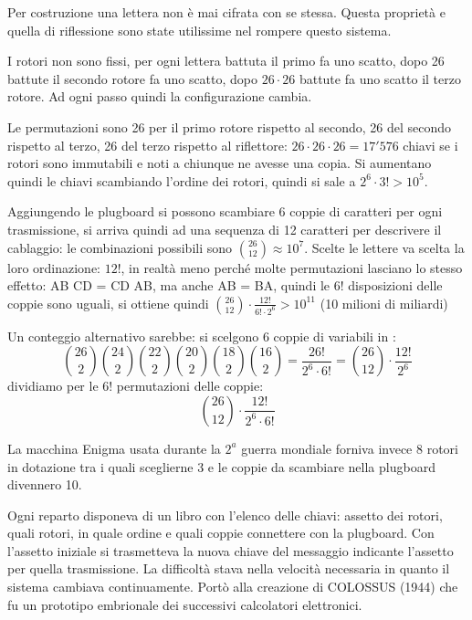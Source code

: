 Per costruzione una lettera non è mai cifrata con se stessa. Questa proprietà e quella di riflessione sono state utilissime nel rompere questo sistema.

I rotori non sono fissi, per ogni lettera battuta il primo fa uno scatto, dopo 26 battute il secondo rotore fa uno scatto, dopo $26 \cdot 26$ battute fa uno scatto il terzo rotore. Ad ogni passo quindi la configurazione cambia.

Le permutazioni sono 26 per il primo rotore rispetto al secondo, 26 del secondo rispetto al terzo, 26 del terzo rispetto al riflettore: $26 \cdot 26 \cdot 26 = 17'576$ chiavi se i rotori sono immutabili e noti a chiunque ne avesse una copia. Si aumentano quindi le chiavi scambiando l'ordine dei rotori, quindi si sale a $2^6 \cdot 3! > 10^5$.

Aggiungendo le plugboard si possono scambiare 6 coppie di caratteri per ogni trasmissione, si arriva quindi ad una sequenza di 12 caratteri per descrivere il cablaggio: le combinazioni possibili sono $\binom{26}{12} \approx 10^7$. Scelte le lettere va scelta la loro ordinazione: $12!$, in realtà meno perché molte permutazioni lasciano lo stesso effetto: AB CD = CD AB, ma anche AB = BA, quindi le $6!$ disposizioni delle coppie sono uguali, si ottiene quindi $\binom{26}{12} \cdot \frac{12!}{6! \cdot 2^6} > 10^{11}$ (10 milioni di miliardi)

Un conteggio alternativo sarebbe: si scelgono 6 coppie di variabili in :
$$ \binom{26}{2} \binom{24}{2} \binom{22}{2} \binom{20}{2} \binom{18}{2} \binom{16}{2} = \frac{26!}{2^6 \cdot 6!} = \binom{26}{12} \cdot \frac{12!}{2^6} $$
dividiamo per le $6!$ permutazioni delle coppie:
$$ \binom{26}{12} \cdot \frac{12!}{2^6 \cdot 6!} $$

La macchina Enigma usata durante la $2^{a}$ guerra mondiale forniva invece 8 rotori in dotazione tra i quali sceglierne 3 e le coppie da scambiare nella plugboard divennero 10.

Ogni reparto disponeva di un libro con l'elenco delle chiavi: assetto dei rotori, quali rotori, in quale ordine e quali coppie connettere con la plugboard. Con l'assetto iniziale si trasmetteva la nuova chiave del messaggio indicante l'assetto per quella trasmissione. La difficoltà stava nella velocità necessaria in quanto il sistema cambiava continuamente. Portò alla creazione di COLOSSUS (1944) che fu un prototipo embrionale dei successivi calcolatori elettronici.